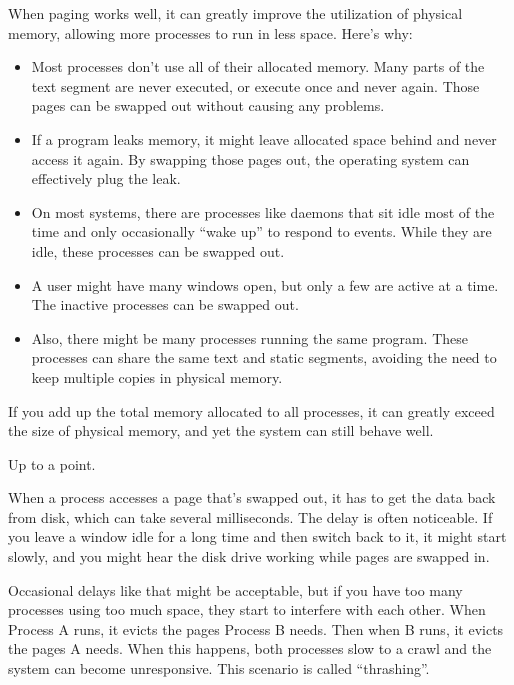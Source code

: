 \documentclass[12pt]{book}
\begin{document}
When paging works well, it can greatly improve the utilization of
physical memory, allowing more processes to run in less space.
Here's why:

\begin{itemize}

\item Most processes don't use all of their allocated memory.  Many
  parts of the text segment are never executed, or execute once and
  never again.  Those pages can be swapped out without causing any
  problems.

\item If a program leaks memory, it might leave allocated space behind
  and never access it again.  By swapping those pages out, the
  operating system can effectively plug the leak.

\item On most systems, there are processes like daemons that sit idle
  most of the time and only occasionally ``wake up'' to respond to
  events.  While they are idle, these processes can be swapped out.

\item A user might have many windows open, but only a few are active
  at a time.  The inactive processes can be swapped out.

\item Also, there might be many processes running the same program.
  These processes can share the same text and static segments, avoiding the need to keep multiple copies in physical memory.

\end{itemize}

If you add up the total memory allocated to all processes, it can
greatly exceed the size of physical memory, and yet the system can
still behave well.

Up to a point.

When a process accesses a page that's swapped out, it has to get the
data back from disk, which can take several milliseconds.  The
delay is often noticeable.  If you leave a window idle for a long
time and then switch back to it, it might start slowly,
and you might hear the disk drive working while pages are
swapped in.  

Occasional delays like that might be acceptable, but if you have too
many processes using too much space, they start to interfere with each
other.  When Process A runs, it evicts the pages Process B needs.
Then when B runs, it evicts the pages A needs.  When this happens,
both processes slow to a crawl and the system can become unresponsive.
This scenario is called ``thrashing''.
\end{document}
